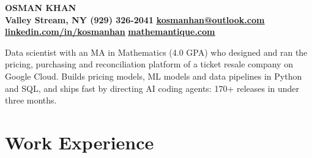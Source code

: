 \documentclass[10pt,letterpaper]{article}
\newcommand{\weblink}[2]{\href{#1}{\color{linkblue}\textbf{\underline{#2}}}}
\begin{document}
\begin{center}
  {\color{navy}\fontsize{20}{24}\selectfont\bfseries OSMAN KHAN}\\[3pt]
  {\small\color{gray}\textbf{Valley Stream, NY \textbullet{} (929) 326-2041 \textbullet{}}
  \weblink{mailto:kosmanhan@outlook.com}{kosmanhan@outlook.com} {\color{gray}\textbullet}
  \weblink{https://linkedin.com/in/kosmanhan}{linkedin.com/in/kosmanhan} {\color{gray}\textbullet}
  \weblink{https://mathemantique.com}{mathemantique.com}}
\end{center}
\vspace{-4pt}{\color{gray}\rule{\linewidth}{0.4pt}}\vspace{2pt}

Data scientist with an MA in Mathematics (4.0 GPA) who designed and ran the pricing, purchasing and reconciliation
platform of a ticket resale company on Google Cloud. Builds pricing models, ML models and data pipelines in Python
and SQL, and ships fast by directing AI coding agents: 170+ releases in under three months.

\section{Work Experience}
\end{document}
